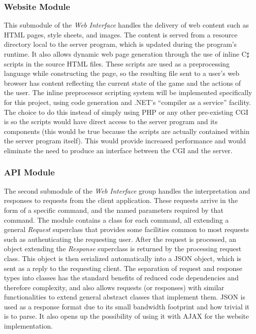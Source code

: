 \subsubsection{Website Module}
This submodule of the \emph{Web Interface} handles the delivery of web content such as HTML pages, style sheets, and images. The content is served from a resource directory local to the server program, which is updated during the program's runtime. It also allows dynamic web page generation through the use of inline C$\sharp$ scripts in the source HTML files. These scripts are used as a preprocessing language while constructing the page, so the resulting file sent to a user's web browser has content reflecting the current state of the game and the actions of the user. The inline preprocessor scripting system will be implemented specifically for this project, using code generation and .NET's ``compiler as a service'' facility. The choice to do this instead of simply using PHP or any other pre-existing CGI is so the scripts would have direct access to the server program and its components (this would be true because the scripts are actually contained within the server program itself). This would provide increased performance and would eliminate the need to produce an interface between the CGI and the server.

\subsubsection{API Module}
The second submodule of the \emph{Web Interface} group handles the interpretation and responses to requests from the client application. These requests arrive in the form of a specific command, and the named parameters required by that command. The module contains a class for each command, all extending a general \emph{Request} superclass that provides some facilities common to most requests such as authenticating the requesting user. After the request is processed, an object extending the \emph{Response} superclass is returned by the processing request class. This object is then serialized automatically into a JSON object, which is sent as a reply to the requesting client. The separation of request and response types into classes has the standard benefits of reduced code dependencies and therefore complexity, and also allows requests (or responses) with similar functionalities to extend general abstract classes that implement them. JSON is used as a response format due to its small bandwidth footprint and how trivial it is to parse. It also opens up the possibility of using it with AJAX for the website implementation.

